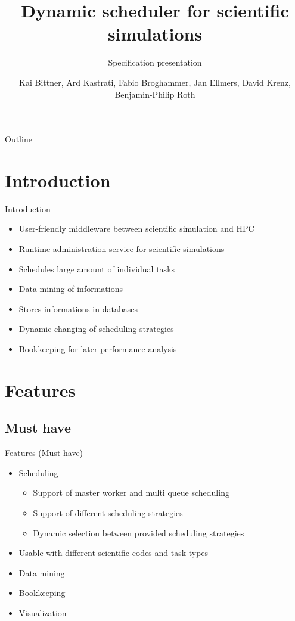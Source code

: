 \documentclass[18pt]{beamer}
\title[Specification presentation]{Dynamic scheduler for scientific simulations}
\subtitle{Specification presentation}
\author{Kai Bittner, Ard Kastrati, Fabio Broghammer, Jan Ellmers, David Krenz, Benjamin-Philip Roth}
\institute{Steinbuch Centre for Computing (SCC)}
\begin{document}

\begin{frame}
\titlepage
\end{frame}

\begin{frame}{Outline}
\tableofcontents
\end{frame}

\section{Introduction}
	\begin{frame}{Introduction}
		\begin{itemize}
			\pause
			\item User-friendly middleware between scientific simulation and HPC
			\pause
			\item Runtime administration service for scientific simulations
			\pause
			\item Schedules large amount of individual tasks
			\pause
			\item Data mining of informations
			\pause
			\item Stores informations in databases
			\pause
			\item Dynamic changing of scheduling strategies
			\pause
			\item Bookkeeping for later performance analysis
		\end{itemize}
	\end{frame}
	
\section{Features}
	\subsection{Must have}
	\begin{frame}{Features (Must have)}
		\begin{itemize}
			\pause
			\item Scheduling	
				\begin{itemize}
					\item Support of master worker and multi queue scheduling
					\item Support of different scheduling strategies
					\item Dynamic selection between provided scheduling strategies
				\end{itemize}
			\pause
			\item Usable with different scientific codes and task-types
			\pause
			\item Data mining
			\pause
			\item Bookkeeping
			\pause
			\item Visualization
		\end{itemize}
	\end{frame}
	
\end{document}

